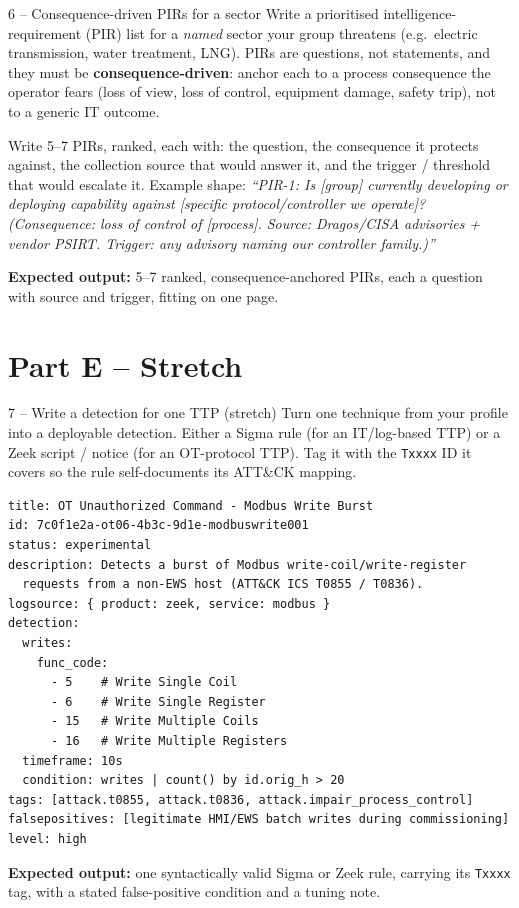 \documentclass[11pt,a4paper]{article}
\begin{document}
\begin{stepbox}{6 -- Consequence-driven PIRs for a sector}
Write a prioritised intelligence-requirement (PIR) list for a \emph{named}
sector your group threatens (e.g.\ electric transmission, water treatment,
LNG). PIRs are questions, not statements, and they must be
\textbf{consequence-driven}: anchor each to a process consequence the operator
fears (loss of view, loss of control, equipment damage, safety trip), not to a
generic IT outcome.

Write 5--7 PIRs, ranked, each with: the question, the consequence it protects
against, the collection source that would answer it, and the trigger /
threshold that would escalate it. Example shape:
\emph{``PIR-1: Is [group] currently developing or deploying capability against
[specific protocol/controller we operate]? (Consequence: loss of control of
[process]. Source: Dragos/CISA advisories + vendor PSIRT. Trigger: any advisory
naming our controller family.)''}

\textbf{Expected output:} 5--7 ranked, consequence-anchored PIRs, each a
question with source and trigger, fitting on one page.
\end{stepbox}

\section*{Part E -- Stretch}

\begin{stepbox}{7 -- Write a detection for one TTP (stretch)}
Turn one technique from your profile into a deployable detection. Either a Sigma
rule (for an IT/log-based TTP) or a Zeek script / notice (for an OT-protocol
TTP). Tag it with the \texttt{Txxxx} ID it covers so the rule self-documents its
ATT\&CK mapping.

\begin{lstlisting}[]
title: OT Unauthorized Command - Modbus Write Burst
id: 7c0f1e2a-ot06-4b3c-9d1e-modbuswrite001
status: experimental
description: Detects a burst of Modbus write-coil/write-register
  requests from a non-EWS host (ATT&CK ICS T0855 / T0836).
logsource: { product: zeek, service: modbus }
detection:
  writes:
    func_code:
      - 5    # Write Single Coil
      - 6    # Write Single Register
      - 15   # Write Multiple Coils
      - 16   # Write Multiple Registers
  timeframe: 10s
  condition: writes | count() by id.orig_h > 20
tags: [attack.t0855, attack.t0836, attack.impair_process_control]
falsepositives: [legitimate HMI/EWS batch writes during commissioning]
level: high
\end{lstlisting}

\textbf{Expected output:} one syntactically valid Sigma or Zeek rule, carrying
its \texttt{Txxxx} tag, with a stated false-positive condition and a tuning note.
\end{stepbox}
\end{document}
